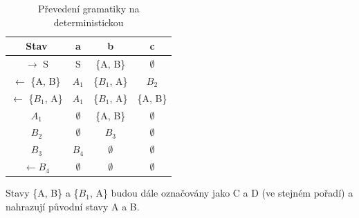 \documentclass[12pt, letterpaper]{article}
\begin{document}
\begin{table}[H]
\begin{center}
\begin{tabular}{| c || c | c | c |}
\hline
	\textbf{Stav} 			& \textbf{a} 	& \textbf{b} 	& \textbf{c}
\\\hline
	$\rightarrow$ S 		& S 		& \{A, B\} 	& $\emptyset$
\\\hline
	$\leftarrow$ \{A, B\} 		& $A_1$ 	& \{$B_1$, A\} 	& $B_2$
\\\hline
	$\leftarrow$ \{$B_1$, A\} 	& $A_1$ 	& \{$B_1$, A\} 	& \{A, B\}
\\\hline
	$A_1$				& $\emptyset$ 	& \{A, B\}	& $\emptyset$
\\\hline
	$B_2$				& $\emptyset$ 	& $B_3$		& $\emptyset$
\\\hline
	$B_3$				& $B_4$ 	& $\emptyset$	& $\emptyset$
\\\hline
	$\leftarrow$$B_4$		& $\emptyset$ 	& $\emptyset$	& $\emptyset$
\\\hline
\end{tabular}
\end{center}
\caption{Převedení gramatiky na deterministickou}
\label{table_1}
\end{table}
%

Stavy \{A, B\} a \{$B_1$, A\} budou dále označovány jako C a D (ve stejném pořadí) a nahrazují původní stavy A a B.
\end{document}
